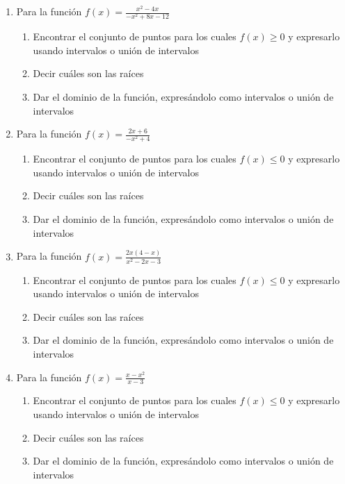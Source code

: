 \documentclass[12pt]{article}
\theoremstyle{definition}
\begin{document}
\begin{enumerate}

\item  
Para la función $f(x) = \frac{x^2-4x}{-x^2+8x-12}$
 \begin{enumerate}
        \item Encontrar el conjunto de puntos para los cuales $f(x) \geq 0$ y expresarlo usando intervalos o unión de intervalos
        \item Decir cuáles son las raíces
        \item Dar el dominio de la función, expresándolo como intervalos o unión de intervalos
\end{enumerate}

\item  
Para la función $f(x) = \frac{2x+6}{-x^2+4}$
\begin{enumerate}
	\item Encontrar el conjunto de puntos para los cuales $f(x) \leq 0$ y expresarlo usando intervalos o unión de intervalos
	\item Decir cuáles son las raíces
	\item Dar el dominio de la función, expresándolo como intervalos o unión de intervalos
\end{enumerate}

\item  
Para la función $f(x) = \frac{2x(4-x)}{x^2-2x-3}$
\begin{enumerate}
	\item Encontrar el conjunto de puntos para los cuales $f(x) \leq 0$ y expresarlo usando intervalos o unión de intervalos
	\item Decir cuáles son las raíces
	\item Dar el dominio de la función, expresándolo como intervalos o unión de intervalos
\end{enumerate}

\item  
Para la función $f(x) = \frac{x-x^2}{x-3}$
\begin{enumerate}
	\item Encontrar el conjunto de puntos para los cuales $f(x) \leq 0$ y expresarlo usando intervalos o unión de intervalos
	\item Decir cuáles son las raíces
	\item Dar el dominio de la función, expresándolo como intervalos o unión de intervalos
\end{enumerate}
\end{enumerate}
\end{document}
